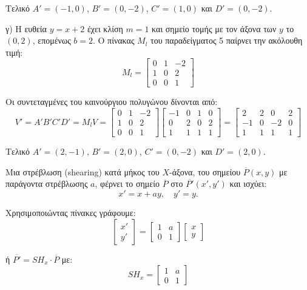 \begin{solution}
Τελικό $A' = (-1, 0)$, $B' = (0, -2)$, $C' = (1, 0)$ και $D' = (0, -2)$.

γ) Η ευθεία $y=x+2$ έχει κλίση $m=1$ και σημείο τομής με τον άξονα των $y$ το $(0,2)$, επομένως $b=2$. Ο πίνακας $M_l$ του παραδείγματος 5 παίρνει την ακόλουθη τιμή:
\[
M_l = \begin{bmatrix}
0 & 1 & -2 \\
1 & 0 & 2 \\
0 & 0 & 1
\end{bmatrix}
\]

Οι συντεταγμένες του καινούργιου πολυγώνου δίνονται από:
\[
V' = A'B'C'D' = M_l V = \begin{bmatrix}
0 & 1 & -2 \\
1 & 0 & 2 \\
0 & 0 & 1
\end{bmatrix}
\begin{bmatrix}
-1 & 0 & 1 & 0 \\
0 & 2 & 0 & 2 \\
1 & 1 & 1 & 1
\end{bmatrix} = \begin{bmatrix}
2 & 2 & 0 & 2 \\
-1 & 0 & -2 & 0 \\
1 & 1 & 1 & 1
\end{bmatrix}
\]

Τελικό $A' = (2, -1)$, $B' = (2, 0)$, $C' = (0, -2)$ και $D' = (2, 0)$.

Μια στρέβλωση (shearing) κατά μήκος του $X$-άξονα, του σημείου $\overline{P}(x, y)$ με παράγοντα στρέβλωσης $a$, φέρνει το σημείο $\overline{P}$ στο $\overline{P'}(x', y')$ και ισχύει:
\[
x' = x + ay, \quad y' = y .
\]

Χρησιμοποιώντας πίνακες γράφουμε:
\[
\begin{bmatrix}
x' \\
y'
\end{bmatrix} = \begin{bmatrix}
1 & a \\
0 & 1
\end{bmatrix}
\begin{bmatrix}
x \\
y
\end{bmatrix}
\]

ή \(\overline{P'} = SH_x \cdot \overline{P}\) με:
\[
SH_x = \begin{bmatrix}
1 & a \\
0 & 1
\end{bmatrix}
\]


\end{solution}
